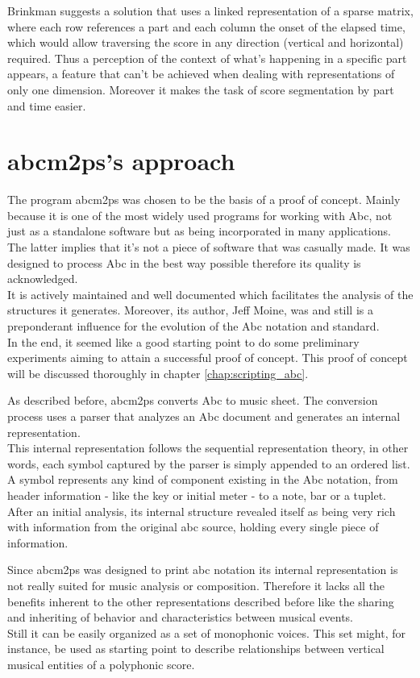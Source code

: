 \documentclass[main.tex]{files}
\begin{document}
Brinkman\cite{Brinkman1984} suggests a solution that uses a linked representation of a sparse
matrix, where each row references a part and each column the onset of the elapsed time, which would
allow traversing the score in any direction (vertical and horizontal) required. Thus a perception of
the context of what's happening in a specific part appears, a feature that can't be achieved when
dealing with representations of only one dimension. Moreover it makes the task of score segmentation
by part and time easier.

\section{abcm2ps's approach} 
\label{sec:abcm2ps_approach}

The program abcm2ps was chosen to be the basis of a proof of concept. Mainly because it is one of
the most widely used programs for working with Abc, not just as a standalone software but as being
incorporated in many applications. The latter implies that it's not a piece of software that was
casually made. It was designed to process Abc in the best way possible therefore its quality is
acknowledged.\\
It is actively maintained and well documented which facilitates the analysis of the structures it
generates. Moreover, its author, Jeff Moine, was and still is a preponderant influence for the
evolution of the Abc notation and standard.\\
In the end, it seemed like a good starting point to do some preliminary experiments aiming to attain
a successful proof of concept. This proof of concept will be discussed thoroughly in chapter
\ref{chap:scripting_abc}.

As described before, abcm2ps converts Abc to music sheet. The conversion process uses a parser that
analyzes an Abc document and generates an internal representation.\\
This internal representation follows the sequential representation theory, in other words, each
symbol captured by the parser is simply appended to an ordered list. A symbol represents any kind of
component existing in the Abc notation, from header information - like the key or initial meter - to
a note, bar or a tuplet. After an initial analysis, its internal structure revealed itself as being
very rich with information from the original abc source, holding every single piece of information.

Since abcm2ps was designed to print abc notation its internal representation is not really suited
for music analysis or composition. Therefore it lacks all the benefits inherent to the other
representations described before like the sharing and inheriting of behavior and characteristics
between musical events.\\
Still it can be easily organized as a set of monophonic voices. This set might, for instance, be
used as starting point to describe relationships between vertical musical entities of a polyphonic
score.
\end{document}
